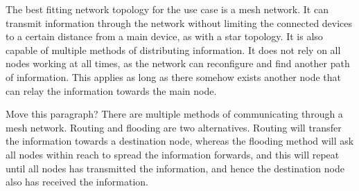 The best fitting network topology for the use case is a mesh network. It can transmit information through the network without limiting the connected devices to a certain distance from a main device, as with a star topology. It is also capable of multiple methods of distributing information. It does not rely on all nodes working at all times, as the network can reconfigure and find another path of information. This applies as long as there somehow exists another node that can relay the information towards the main node.

Move this paragraph?
There are multiple methods of communicating through a mesh network. Routing and flooding are two alternatives. Routing will transfer the information towards a destination node, whereas the flooding method will ask all nodes within reach to spread the information forwards, and this will repeat until all nodes has transmitted the information, and hence the destination node also has received the information.

